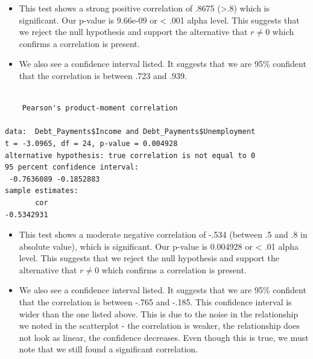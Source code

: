 \documentclass[
  letterpaper,
  DIV=11,
  numbers=noendperiod]{scrreprt}
\newenvironment{Shaded}{\begin{snugshade}}{\end{snugshade}}
\newcommand{\FunctionTok}[1]{\textcolor[rgb]{0.28,0.35,0.67}{#1}}
\newcommand{\NormalTok}[1]{\textcolor[rgb]{0.00,0.23,0.31}{#1}}
\newcommand{\SpecialCharTok}[1]{\textcolor[rgb]{0.37,0.37,0.37}{#1}}
\providecommand{\tightlist}{%
  \setlength{\itemsep}{0pt}\setlength{\parskip}{0pt}}\usepackage{longtable,booktabs,array}
\begin{document}
\begin{itemize}
\tightlist
\item
  This test shows a strong positive correlation of .8675
  (\textgreater.8) which is significant. Our p-value is 9.66e-09 or
  \textless{} .001 alpha level. This suggests that we reject the null
  hypothesis and support the alternative that \(r \neq 0\) which
  confirms a correlation is present.
\item
  We also see a confidence interval listed. It suggests that we are 95\%
  confident that the correlation is between .723 and .939.
\end{itemize}

\begin{Shaded}
\end{Shaded}

\begin{verbatim}

    Pearson's product-moment correlation

data:  Debt_Payments$Income and Debt_Payments$Unemployment
t = -3.0965, df = 24, p-value = 0.004928
alternative hypothesis: true correlation is not equal to 0
95 percent confidence interval:
 -0.7636089 -0.1852883
sample estimates:
       cor 
-0.5342931 
\end{verbatim}

\begin{itemize}
\tightlist
\item
  This test shows a moderate negative correlation of -.534 (between .5
  and .8 in absolute value), which is significant. Our p-value is
  0.004928 or \textless{} .01 alpha level. This suggests that we reject
  the null hypothesis and support the alternative that \(r \neq 0\)
  which confirms a correlation is present.
\item
  We also see a confidence interval listed. It suggests that we are 95\%
  confident that the correlation is between -.765 and -.185. This
  confidence interval is wider than the one listed above. This is due to
  the noise in the relationship we noted in the scatterplot - the
  correlation is weaker, the relationship does not look as linear, the
  confidence decreases. Even though this is true, we must note that we
  still found a significant correlation.
\end{itemize}
\end{document}
